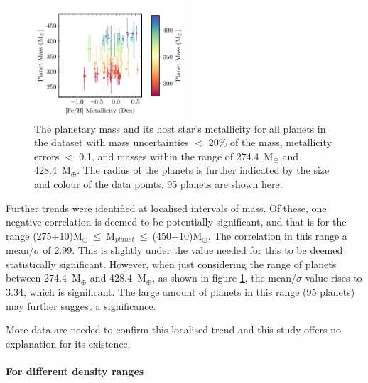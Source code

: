 \documentclass[a4paper,twocolumn,12pt]{article}
\begin{document}
\begin{figure}[h!]
    \centering
    \includegraphics[width=0.5\textwidth]{Graphs/FeH vs Mass Planet Plot 274.4 to 428.4.pdf}
    \caption{The planetary mass and its host star's metallicity for all planets in the dataset with mass uncertainties $<$ 20\% of the mass, metallicity errors $<$ 0.1, and masses within the range of 274.4~M$_{\oplus}$ and 428.4~M$_{\oplus}$. The radius of the planets is further indicated by the size and colour of the data points. 95 planets are shown here.}
    \label{figure: Fe/H vs Mass for the jupiter mass range}
\end{figure}

Further trends were identified at localised intervals of mass. Of these, one negative correlation is deemed to be potentially significant, and that is for the range (275$\pm$10)M$_{\oplus}~\leq~$M$_{planet}~\leq~$(450$\pm$10)M$_{\oplus}$. The correlation in this range a mean/$\sigma$ of 2.99. This is slightly under the value needed for this to be deemed statistically significant. %
However, when just considering the range of planets between 274.4~M$_{\oplus}$ and 428.4~M$_{\oplus}$, as shown in figure \ref{figure: Fe/H vs Mass for the jupiter mass range}, the mean/$\sigma$ value rises to 3.34, which is significant. The large amount of planets in this range (95 planets) may further suggest a significance.

More data are needed to confirm this localised trend and this study offers no explanation for its existence.




\paragraph{For different density ranges}
\vspace{-1.8em}
\end{document}
